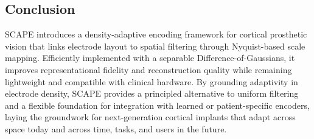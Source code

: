 \subsection{Conclusion}
SCAPE introduces a density-adaptive encoding framework for cortical prosthetic vision that links electrode layout to spatial filtering through Nyquist-based scale mapping. Efficiently implemented with a separable Difference-of-Gaussians, it improves representational fidelity and reconstruction quality while remaining lightweight and compatible with clinical hardware. By grounding adaptivity in electrode density, SCAPE provides a principled alternative to uniform filtering and a flexible foundation for integration with learned or patient-specific encoders, laying the groundwork for next-generation cortical implants that adapt across space today and across time, tasks, and users in the future.
